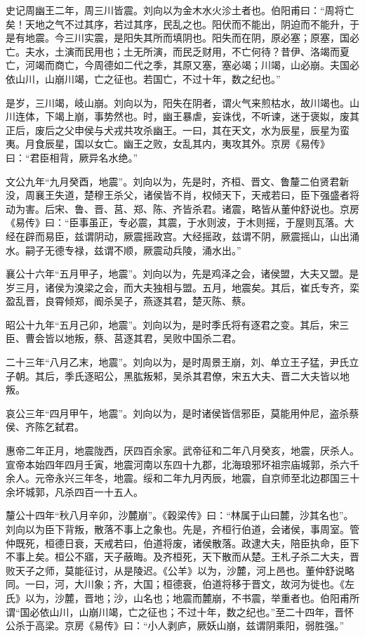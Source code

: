 \documentclass[]{article}
\begin{document}
史记周幽王二年，周三川皆震。刘向以为金木水火沴土者也。伯阳甫曰：``周将亡矣！天地之气不过其序，若过其序，民乱之也。阳伏而不能出，阴迫而不能升，于是有地震。今三川实震，是阳失其所而填阴也。阳失而在阴，原必塞；原塞，国必亡。夫水，土演而民用也；土无所演，而民乏财用，不亡何待？昔伊、洛竭而夏亡，河竭而商亡，今周德如二代之季，其原又塞，塞必竭；川竭，山必崩。夫国必依山川，山崩川竭，亡之征也。若国亡，不过十年，数之纪也。''

是岁，三川竭，岐山崩。刘向以为，阳失在阴者，谓火气来煎枯水，故川竭也。山川连体，下竭上崩，事势然也。时，幽王暴虐，妄诛伐，不听谏，迷于褒姒，废其正后，废后之父申侯与犬戎共攻杀幽王。一曰，其在天文，水为辰星，辰星为蛮夷。月食辰星，国以女亡。幽王之败，女乱其内，夷攻其外。京房《易传》曰：``君臣相背，厥异名水绝。''

文公九年``九月癸酉，地震''。刘向以为，先是时，齐桓、晋文、鲁釐二伯贤君新没，周襄王失道，楚穆王杀父，诸侯皆不肖，权倾天下，天戒若曰，臣下强盛者将动为害。后宋、鲁、晋、莒、郑、陈、齐皆杀君。诸震，略皆从董仲舒说也。京房《易传》曰：``臣事虽正，专必震，其震，于水则波，于木则摇，于屋则瓦落。大经在辟而易臣，兹谓阴动，厥震摇政宫。大经摇政，兹谓不阴，厥震摇山，山出涌水。嗣子无德专禄，兹谓不顺，厥震动兵陵，涌水出。''

襄公十六年``五月甲子，地震''。刘向以为，先是鸡泽之会，诸侯盟，大夫又盟。是岁三月，诸侯为溴梁之会，而大夫独相与盟。五月，地震矣。其后，崔氏专齐，栾盈乱晋，良霄倾郑，阍杀吴子，燕逐其君，楚灭陈、蔡。

昭公十九年``五月己卯，地震''。刘向以为，是时季氏将有逐君之变。其后，宋三臣、曹会皆以地叛，蔡、莒逐其君，吴败中国杀二君。

二十三年``八月乙末，地震''。刘向以为，是时周景王崩，刘、单立王子猛，尹氏立子朝。其后，季氏逐昭公，黑肱叛邾，吴杀其君僚，宋五大夫、晋二大夫皆以地叛。

哀公三年``四月甲午，地震''。刘向以为，是时诸侯皆信邪臣，莫能用仲尼，盗杀蔡侯、齐陈乞弑君。

惠帝二年正月，地震陇西，厌四百余家。武帝征和二年八月癸亥，地震，厌杀人。宣帝本始四年四月壬寅，地震河南以东四十九郡，北海琅邪坏祖宗庙城郭，杀六千余人。元帝永兴三年冬，地震。绥和二年九月丙辰，地震，自京师至北边郡国三十余坏城郭，凡杀四百一十五人。

釐公十四年``秋八月辛卯，沙麓崩''。《穀梁传》曰：``林属于山曰麓，沙其名也''。刘向以为臣下背叛，散落不事上之象也。先是，齐桓行伯道，会诸侯，事周室。管仲既死，桓德日衰，天戒若曰，伯道将废，诸侯散落。政逮大夫，陪臣执命，臣下不事上矣。桓公不寤，天子蔽晦。及齐桓死，天下散而从楚。王札子杀二大夫，晋败天子之师，莫能征讨，从是陵迟。《公羊》以为，沙麓，河上邑也。董仲舒说略同。一曰，河，大川象；齐，大国；桓德衰，伯道将移于晋文，故河为徙也。《左氏》以为，沙麓，晋地；沙，山名也；地震而麓崩，不书震，举重者也。伯阳甫所谓``国必依山川，山崩川竭，亡之征也；不过十年，数之纪也。''至二十四年，晋怀公杀于高梁。京房《易传》曰：``小人剥庐，厥妖山崩，兹谓阴乘阳，弱胜强。''
\end{document}
